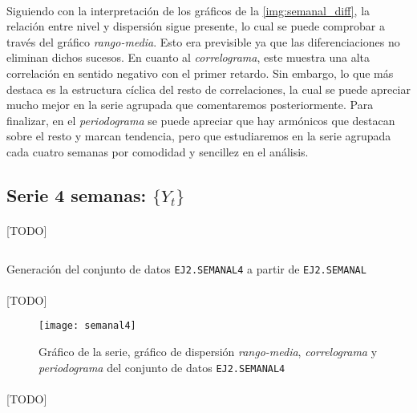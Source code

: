 \documentclass[a4paper, spanish]{article}
\begin{document}
      \paragraph{}
      Siguiendo con la interpretación de los gráficos de la \ref{img:semanal_diff}, la relación entre nivel y dispersión sigue presente, lo cual se puede comprobar a través del gráfico \emph{rango-media}. Esto era previsible ya que las diferenciaciones no eliminan dichos sucesos. En cuanto al \emph{correlograma}, este muestra una alta correlación en sentido negativo con el primer retardo. Sin embargo, lo que más destaca es la estructura cíclica del resto de correlaciones, la cual se puede apreciar mucho mejor en la serie agrupada que comentaremos posteriormente. Para finalizar, en el \emph{periodograma} se puede apreciar que hay armónicos que destacan sobre el resto y marcan tendencia, pero que estudiaremos en la serie agrupada cada cuatro semanas por comodidad y sencillez en el análisis.

    \subsection{Serie 4 semanas: $\{Y_t\}$}
    \label{sec:weekly4_analysis}

      \paragraph{}
      [TODO]

      \begin{listing}[htb!]
        \centering
        \inputminted{SAS}{./res/code/a-02-expand.sas}
        \caption{Generación del conjunto de datos \texttt{EJ2.SEMANAL4} a partir de \texttt{EJ2.SEMANAL}}
        \label{code:a_expand}
      \end{listing}

      \paragraph{}
      [TODO]

      \begin{figure}[htb!]
        \centering
        \texttt{[image: semanal4]}
        \caption{Gráfico de la serie, gráfico de dispersión \emph{rango-media}, \emph{correlograma} y \emph{periodograma} del conjunto de datos \texttt{EJ2.SEMANAL4}}
        \label{img:semanal4}
      \end{figure}

      \paragraph{}
      [TODO]
\end{document}
